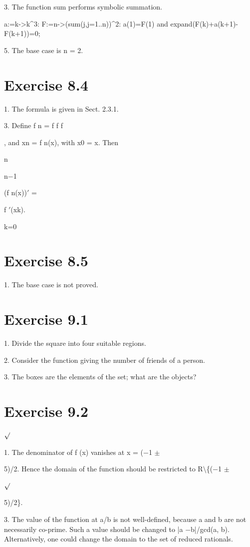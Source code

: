 \documentclass[11pt]{article}
\theoremstyle{plain}
\theoremstyle{definition}
\begin{document}
3. The function sum performs symbolic summation.

a:=k->k\^{}3: F:=n->(sum(j,j=1..n))\^{}2: a(1)=F(1) and expand(F(k)+a(k+1)-F(k+1))=0;

5. The base case is n = 2.

\section{Exercise 8.4}

1. The formula is given in Sect. 2.3.1.

3. Define f n = f f \textperiodcentered{} \textperiodcentered{} \textperiodcentered{} f

, and xn = f n(x), with x0 = x. Then

n

n$-$1

(f n(x))$'$ =

f $'$(xk).

k=0

\section{Exercise 8.5}

1. The base case is not proved.

\section{Exercise 9.1}

1. Divide the square into four suitable regions.

2. Consider the function giving the number of friends of a person.

3. The boxes are the elements of the set; what are the objects?

\section{Exercise 9.2}

$\surd$

1. The denominator of f (x) vanishes at x = ($-$1 $\pm$

5)/2. Hence the domain of the function should be restricted to R$\setminus$\{($-$1 $\pm$

$\surd$

5)/2\}.

3. The value of the function at a/b is not well-defined, because a and b are not necessarily co-prime. Such a value should be changed to |a $-$b|/gcd(a, b). Alternatively, one could change the domain to the set of reduced rationals.
\end{document}
